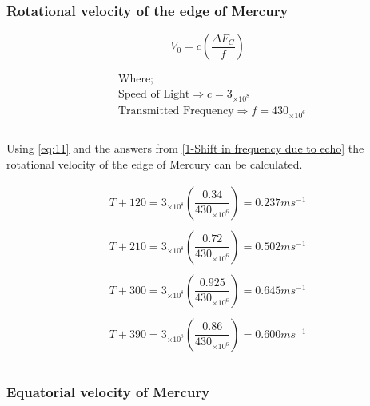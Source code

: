 \documentclass[11pt]{article}
\begin{document}
\begin{multicols}{2}

\subsubsection{Rotational velocity of the edge of Mercury} 

\begin{equation} \label{eq:11}
{V_{0} = c \left(\dfrac{\Delta F_{C}}{f}\right)}
\end{equation}

\begin{equation*}
\begin{split}
&\text{Where;} \\
&\text{Speed of Light} \Rightarrow {c}=3_{\times10^8} \\
&\text{Transmitted Frequency} \Rightarrow {f}=430_{\times10^6} \\
\end{split}
\end{equation*} \\

Using \cref{eq:11} and the answers from \cref{1-Shift in frequency due to echo} the rotational velocity of the edge of Mercury can be calculated.

\begin{equation}\label{1-Rotational velocity of the edge of Mercury}
\begin{split}
{T+120 = 3_{\times10^8} \left(\dfrac{0.34}{430_{\times10^6}}\right)} = 0.237ms^{-1}\\
\\
{T+210 = 3_{\times10^8} \left(\dfrac{0.72}{430_{\times10^6}}\right)} = 0.502ms^{-1}\\
\\
{T+300 = 3_{\times10^8} \left(\dfrac{0.925}{430_{\times10^6}}\right)} = 0.645ms^{-1}\\
\\
{T+390 = 3_{\times10^8} \left(\dfrac{0.86}{430_{\times10^6}}\right)} = 0.600ms^{-1}\\
\\
\end{split}
\end{equation}


\subsubsection{Equatorial velocity of Mercury}


\end{multicols}
\end{document}
